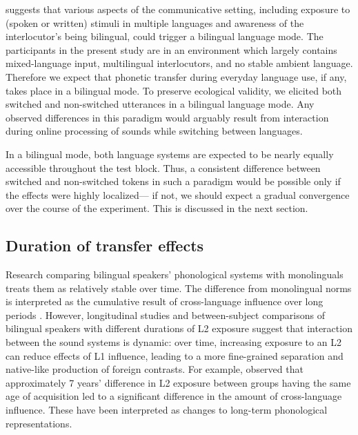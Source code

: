 \documentclass[12 pt]{article}
\begin{document}
\cite{grosjean1998studying} suggests that various aspects of the communicative setting, including exposure to (spoken or written) stimuli in multiple languages and awareness of the interlocutor's being bilingual, could trigger a bilingual language mode. The participants in the present study are in an environment which largely contains mixed-language input, multilingual interlocutors, and no stable ambient language. Therefore we expect that phonetic transfer during everyday language use, if any, takes place in a bilingual mode.  To preserve ecological validity, we elicited both switched and non-switched utterances in a bilingual language mode. Any observed differences in this paradigm would arguably result from interaction during online processing of sounds while switching between languages. 

In a bilingual mode, both language systems are expected to be nearly equally accessible throughout the test block. Thus, a consistent difference between switched and non-switched tokens in such a paradigm would be possible only if the effects were highly localized--- if not, we should expect a gradual convergence over the course of the experiment. This is discussed in the next section.


\subsection{Duration of transfer effects} \label{duration}

Research comparing bilingual speakers' phonological systems with monolinguals treats them as relatively stable over time. The difference from monolingual norms is interpreted as the cumulative result of cross-language influence over long periods \citep[e.g.][]{guion2003vowel, caramazza1973acquisition}. However, longitudinal studies %
and between-subject comparisons of bilingual speakers with different durations of L2 exposure suggest that interaction between the sound systems is dynamic: over time, increasing exposure to an L2 can reduce effects of L1 influence, leading to a more fine-grained separation and native-like production of foreign contrasts. For example, \cite[][vowel quality]{bohn1992production} 
observed that approximately 7 years' difference in L2 exposure between groups having the same age of acquisition led to a significant difference in the amount of cross-language influence. These have been interpreted as changes to long-term phonological representations.
\end{document}
